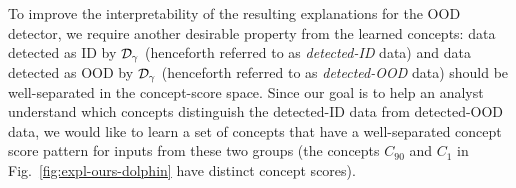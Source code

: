 \fi

 To improve the interpretability of the resulting explanations for the OOD detector, we require another desirable property from the learned concepts: data detected as ID by $\mathcal{D}_\gamma$ (henceforth referred to as \textit{detected-ID} data) and data detected as OOD by $\mathcal{D}_\gamma$ (henceforth referred to as \textit{detected-OOD} data) should be well-separated in the concept-score space.
Since our goal is to help an analyst understand which concepts distinguish the detected-ID data from detected-OOD data, we would like to learn a set of concepts that have a well-separated concept score pattern for inputs from these two groups (\eg the concepts $C_{90}$ and $C_1$ in Fig.~\ref{fig:expl-ours-dolphin} have distinct concept scores).

